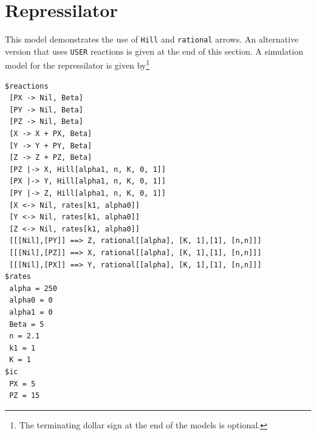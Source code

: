 \clearpage
\section{Repressilator}
This model demonstrates the use of {\tt Hill} and {\tt rational} arrows.  An alternative version that uses {\tt USER} reactions is given at the end of this section.  A simulation model for the repressilator \cite{Repressilator} is given by\footnote{The terminating dollar sign at the end of the models is optional.}
\begin{lstlisting}
$reactions
 [PX -> Nil, Beta]
 [PY -> Nil, Beta]
 [PZ -> Nil, Beta]
 [X -> X + PX, Beta]
 [Y -> Y + PY, Beta]
 [Z -> Z + PZ, Beta]
 [PZ |-> X, Hill[alpha1, n, K, 0, 1]]
 [PX |-> Y, Hill[alpha1, n, K, 0, 1]]
 [PY |-> Z, Hill[alpha1, n, K, 0, 1]]
 [X <-> Nil, rates[k1, alpha0]]
 [Y <-> Nil, rates[k1, alpha0]]
 [Z <-> Nil, rates[k1, alpha0]]
 [[[Nil],[PY]] ==> Z, rational[[alpha], [K, 1],[1], [n,n]]]
 [[[Nil],[PZ]] ==> X, rational[[alpha], [K, 1],[1], [n,n]]]
 [[[Nil],[PX]] ==> Y, rational[[alpha], [K, 1],[1], [n,n]]]
$rates
 alpha = 250
 alpha0 = 0
 alpha1 = 0
 Beta = 5
 n = 2.1 
 k1 = 1
 K = 1
$ic
 PX = 5
 PZ = 15
\end{lstlisting}

